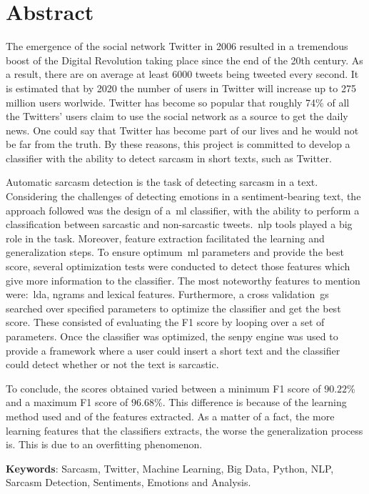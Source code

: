 \cleardoublepage
{}
\chapter*{Abstract}
The emergence of the social network Twitter in 2006 resulted in a tremendous boost of the Digital Revolution taking place since the end of the 20th century. As a result, there are on average at least 6000 tweets being tweeted every second. It is estimated that by 2020 the number of users in Twitter will increase up to 275 million users worlwide. Twitter has become so popular that roughly 74\% of all the Twitters' users claim to use the social network as a source to get the daily news. One could say that Twitter has become part of our lives and he would not be far from the truth. By these reasons, this project is committed to develop a classifier with the ability to detect sarcasm in short texts, such as Twitter. \par
Automatic sarcasm detection is the task of detecting sarcasm in a text. Considering the challenges of detecting emotions in a sentiment-bearing text, the approach followed was the design of a~\acf{ml} classifier, with the ability to perform a classification between sarcastic and non-sarcastic tweets.~\acf{nlp} tools played a big role in the task. Moreover, feature extraction facilitated the learning and generalization steps. To ensure optimum~\ac{ml} parameters and provide the best score, several optimization tests were conducted to detect those features which give more information to the classifier. The most noteworthy features to mention were:~\acf{lda}, ngrams and lexical features. Furthermore, a cross validation~\acf{gs} searched over specified parameters to optimize the classifier and get the best score. These consisted of evaluating the F1 score by looping over a set of parameters.  Once the classifier was optimized, the senpy engine was used to provide a framework where a user could insert a short text and the classifier could detect whether or not the text is sarcastic.\par
To conclude, the scores obtained varied between a minimum F1 score of $90.22$\% and a maximum F1 score of $96.68$\%. This difference is because of the learning method used and of the features extracted. As a matter of a fact, the more learning features that the classifiers extracts, the worse the generalization process is. This is due to an overfitting phenomenon.


\vfill
\textbf{Keywords}: Sarcasm, Twitter, Machine Learning, Big Data, Python, NLP, Sarcasm Detection, Sentiments, Emotions and Analysis.